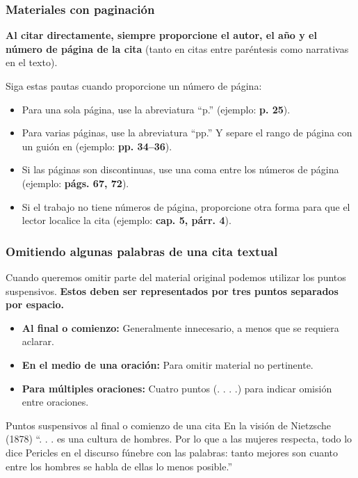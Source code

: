 \documentclass[
11pt, %
]{beamer}
\begin{document}
\begin{frame}
	\frametitle{Materiales con paginación}

	\textbf{Al citar directamente, siempre proporcione el autor, el año y el número de página de la cita} (tanto en citas entre paréntesis como narrativas en el texto).

	Siga estas pautas cuando proporcione un número de página:
	\begin{itemize}
		\item Para una sola página, use la abreviatura “p.” (ejemplo: \textbf{p. 25}).
		\item Para varias páginas, use la abreviatura “pp.” Y separe el rango de página con un guión en (ejemplo: \textbf{pp. 34–36}).
		\item Si las páginas son discontinuas, use una coma entre los números de página (ejemplo: \textbf{págs. 67, 72}).
		\item Si el trabajo no tiene números de página, proporcione otra forma para que el lector localice la cita (ejemplo: \textbf{cap. 5, párr. 4}).
	\end{itemize}

\end{frame}

\begin{frame}
	\frametitle{Omitiendo algunas palabras de una cita textual}

	Cuando queremos omitir parte del material original podemos utilizar los puntos suspensivos. \textbf{Estos deben ser representados por tres puntos separados por espacio.}

	\begin{itemize}
		\item \textbf{Al final o comienzo:} Generalmente innecesario, a menos que se requiera aclarar.
		\item \textbf{En el medio de una oración:} Para omitir material no pertinente.
		\item \textbf{Para múltiples oraciones:} Cuatro puntos (. . . .) para indicar omisión entre oraciones.
	\end{itemize}

	\begin{exampleblock}{Puntos suspensivos al final o comienzo de una cita}
		En la visión de Nietzsche (1878) ``{\color{blue}. . .} es una cultura de hombres. Por lo que a las mujeres respecta, todo lo dice Pericles en el discurso fúnebre con las palabras: tanto mejores son cuanto entre los hombres se habla de ellas lo menos posible.''
	\end{exampleblock}

\end{frame}
\end{document}
